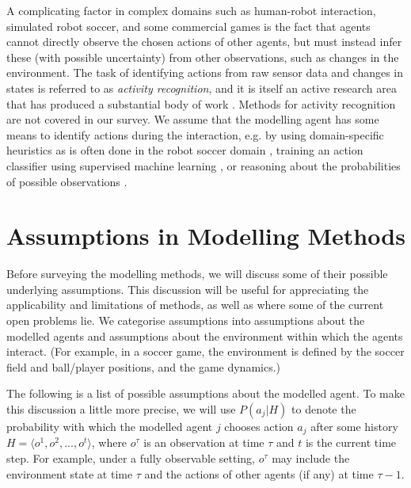 \documentclass[final,1p,times,authoryear]{elsarticle}
\begin{document}
A complicating factor in complex domains such as human-robot interaction, simulated robot soccer, and some commercial games is the fact that agents cannot directly observe the chosen actions of other agents, but must instead infer these (with possible uncertainty) from other observations, such as changes in the environment. The task of identifying actions from raw sensor data and changes in states is referred to as \emph{activity recognition}, and it is itself an active research area that has produced a substantial body of work \citep{sgb2014}. Methods for activity recognition are not covered in our survey. We assume that the modelling agent has some means to identify actions during the interaction, e.g. by using domain-specific heuristics as is often done in the robot soccer domain \citep[e.g.][]{kfcv2002}, training an action classifier using supervised machine learning \citep[e.g.][]{lasb2009}, or reasoning about the probabilities of possible observations \citep[e.g.][]{pg2017}.


	\section{Assumptions in Modelling Methods} \label{sec:assum}

Before surveying the modelling methods, we will discuss some of their possible underlying assumptions. This discussion will be useful for appreciating the applicability and limitations of methods, as well as where some of the current open problems lie. We categorise assumptions into assumptions about the modelled agents and assumptions about the environment within which the agents interact. (For example, in a soccer game, the environment is defined by the soccer field and ball/player positions, and the game dynamics.) 

The following is a list of possible assumptions about the modelled agent. To make this discussion a little more precise, we will use $P(a_j | H)$ to denote the probability with which the modelled agent $j$ chooses action $a_j$ after some history $H = \langle o^1,o^2,...,o^t \rangle$, where $o^\tau$ is an observation at time $\tau$ and $t$ is the current time step. For example, under a fully observable setting, $o^\tau$ may include the environment state at time $\tau$ and the actions of other agents (if any) at time $\tau-1$.
\end{document}
